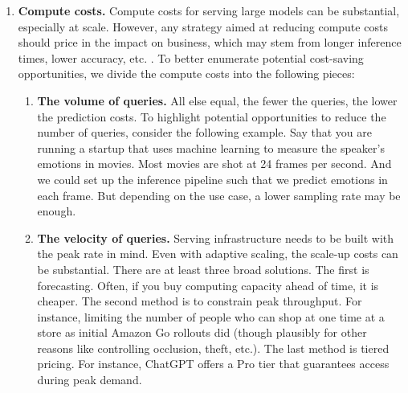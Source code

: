 \documentclass[12pt, letterpaper]{article}
\begin{document}
\begin{enumerate}

    \item \textbf{Compute costs.} Compute costs for serving large models can be substantial, especially at scale. However, any strategy aimed at reducing compute costs should price in the impact on business, which may stem from longer inference times, lower accuracy, etc. \citep{dhingra2017model}. To better enumerate potential cost-saving opportunities, we divide the compute costs into the following pieces: 
    \begin{enumerate}
        \item \textbf{The volume of queries.} All else equal, the fewer the queries, the lower the prediction costs. To highlight potential opportunities to reduce the number of queries, consider the following example. Say that you are running a startup that uses machine learning to measure the speaker’s emotions in movies. Most movies are shot at 24 frames per second. And we could set up the inference pipeline such that we predict emotions in each frame. But depending on the use case, a lower sampling rate may be enough.
    
        \item \textbf{The velocity of queries.} Serving infrastructure needs to be built with the peak rate in mind. Even with adaptive scaling, the scale-up costs can be substantial. There are at least three broad solutions. The first is forecasting. Often, if you buy computing capacity ahead of time, it is cheaper.  The second method is to constrain peak throughput. For instance, limiting the number of people who can shop at one time at a store as initial Amazon Go rollouts did (though plausibly for other reasons like controlling occlusion, theft, etc.). The last method is tiered pricing. For instance, ChatGPT offers a Pro tier that guarantees access during peak demand.  
    

\end{enumerate}
\end{enumerate}
\end{document}
